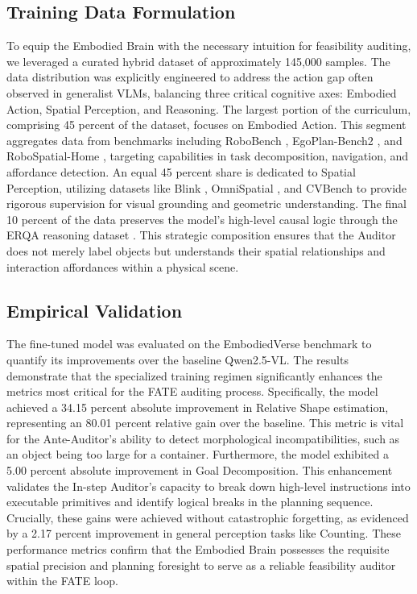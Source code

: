 \documentclass{article}
\theoremstyle{plain}
\theoremstyle{definition}
\theoremstyle{remark}
\begin{document}
\subsection{Training Data Formulation}
To equip the Embodied Brain with the necessary intuition for feasibility auditing, we leveraged a curated hybrid dataset of approximately 145,000 samples. The data distribution was explicitly engineered to address the action gap often observed in generalist VLMs, balancing three critical cognitive axes: Embodied Action, Spatial Perception, and Reasoning. The largest portion of the curriculum, comprising 45 percent of the dataset, focuses on Embodied Action. This segment aggregates data from benchmarks including RoboBench \citep{robobench}, EgoPlan-Bench2 \citep{egoplan}, and RoboSpatial-Home \citep{robospatial}, targeting capabilities in task decomposition, navigation, and affordance detection. An equal 45 percent share is dedicated to Spatial Perception, utilizing datasets like Blink \citep{blink}, OmniSpatial \citep{omnispatial}, and CVBench \citep{cvbench} to provide rigorous supervision for visual grounding and geometric understanding. The final 10 percent of the data preserves the model's high-level causal logic through the ERQA reasoning dataset \citep{erqa}. This strategic composition ensures that the Auditor does not merely label objects but understands their spatial relationships and interaction affordances within a physical scene.

\subsection{Empirical Validation}
The fine-tuned model was evaluated on the EmbodiedVerse benchmark \citep{he2025flagevalmm} to quantify its improvements over the baseline Qwen2.5-VL. The results demonstrate that the specialized training regimen significantly enhances the metrics most critical for the FATE auditing process. Specifically, the model achieved a 34.15 percent absolute improvement in Relative Shape estimation, representing an 80.01 percent relative gain over the baseline. This metric is vital for the Ante-Auditor's ability to detect morphological incompatibilities, such as an object being too large for a container. Furthermore, the model exhibited a 5.00 percent absolute improvement in Goal Decomposition. This enhancement validates the In-step Auditor's capacity to break down high-level instructions into executable primitives and identify logical breaks in the planning sequence. Crucially, these gains were achieved without catastrophic forgetting, as evidenced by a 2.17 percent improvement in general perception tasks like Counting. These performance metrics confirm that the Embodied Brain possesses the requisite spatial precision and planning foresight to serve as a reliable feasibility auditor within the FATE loop.





\end{document}
